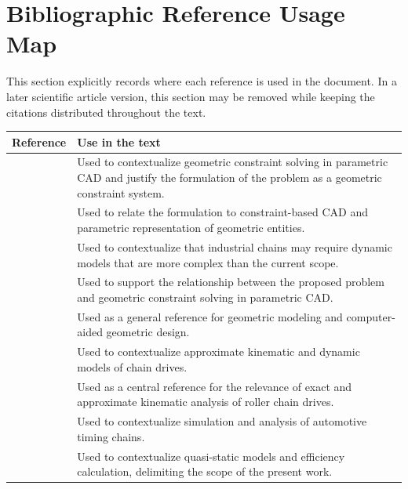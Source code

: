 \documentclass[12pt,a4paper]{article}
\begin{document}
\section{Bibliographic Reference Usage Map}

This section explicitly records where each reference is used in the document. In a later scientific article version, this section may be removed while keeping the citations distributed throughout the text.

\begin{longtable}{p{} p{}}
\toprule
\textbf{Reference} & \textbf{Use in the text} \\
\midrule
\endhead

\cite{zou2022} &
Used to contextualize geometric constraint solving in parametric CAD and justify the formulation of the problem as a geometric constraint system. \\

\cite{fudos1996} &
Used to relate the formulation to constraint-based CAD and parametric representation of geometric entities. \\

\cite{kim2017} &
Used to contextualize that industrial chains may require dynamic models that are more complex than the current scope. \\

\cite{bettig2011} &
Used to support the relationship between the proposed problem and geometric constraint solving in parametric CAD. \\

\cite{farin2002} &
Used as a general reference for geometric modeling and computer-aided geometric design. \\

\cite{fuglede2016jsv} &
Used to contextualize approximate kinematic and dynamic models of chain drives. \\

\cite{fuglede2016mmt} &
Used as a central reference for the relevance of exact and approximate kinematic analysis of roller chain drives. \\

\cite{mulik2016} &
Used to contextualize simulation and analysis of automotive timing chains. \\

\cite{lanaspeze2024} &
Used to contextualize quasi-static models and efficiency calculation, delimiting the scope of the present work. \\

\bottomrule
\end{longtable}
\end{document}
